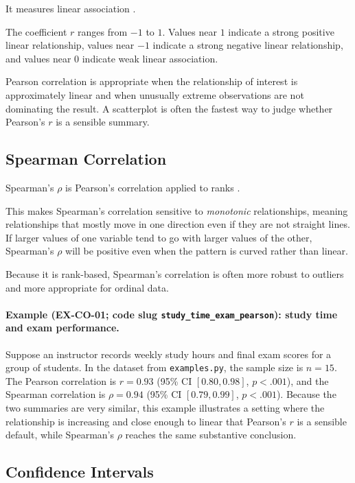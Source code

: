 \documentclass[11pt]{article}
\begin{document}
It measures linear association \citep{pearson1895notes}.

The coefficient $r$ ranges from $-1$ to $1$. Values near $1$ indicate a strong positive linear relationship, values near $-1$ indicate a strong negative linear relationship, and values near $0$ indicate weak linear association.

Pearson correlation is appropriate when the relationship of interest is approximately linear and when unusually extreme observations are not dominating the result. A scatterplot is often the fastest way to judge whether Pearson's $r$ is a sensible summary.

\subsection{Spearman Correlation}

Spearman's $\rho$ is Pearson's correlation applied to ranks \citep{spearman1904proof}.

This makes Spearman's correlation sensitive to \emph{monotonic} relationships, meaning relationships that mostly move in one direction even if they are not straight lines. If larger values of one variable tend to go with larger values of the other, Spearman's $\rho$ will be positive even when the pattern is curved rather than linear.

Because it is rank-based, Spearman's correlation is often more robust to outliers and more appropriate for ordinal data.

\paragraph{Example (EX-CO-01; code slug \texttt{study\_time\_exam\_pearson}): study time and exam performance.}
Suppose an instructor records weekly study hours and final exam scores for a group of students. In the dataset from \verb|examples.py|, the sample size is $n = 15$. The Pearson correlation is $r = 0.93$ (95\% CI $[0.80, 0.98]$, $p < .001$), and the Spearman correlation is $\rho = 0.94$ (95\% CI $[0.79, 0.99]$, $p < .001$). Because the two summaries are very similar, this example illustrates a setting where the relationship is increasing and close enough to linear that Pearson's $r$ is a sensible default, while Spearman's $\rho$ reaches the same substantive conclusion.

\subsection{Confidence Intervals}
\end{document}
